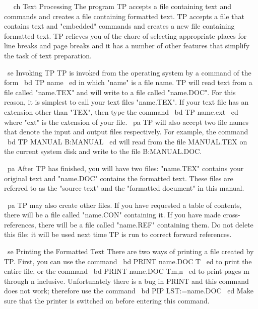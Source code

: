 \ec ~
~ch Text Processing
The program TP accepts a file containing text and commands and creates
a file containing formatted text.
TP accepts a file that contains text and "embedded" commands and creates
a new file containing formatted text.
TP relieves you of the chore of selecting appropriate places for
line breaks and page breaks and it has a number of other features
that simplify the task of text preparation.

~se Invoking TP
TP is invoked from the operating system by a command of the form
~bd TP name ~ed
in which "name" is a file name.
TP will read text from a file called "name.TEX" and will write to a file
called "name.DOC".
For this reason, it is simplest to call your text files "name.TEX".
If your text file has an extension other than "TEX", then type the
command
~bd TP name.ext ~ed
where "ext" is the extension of your file.
~pa TP will also accept two file names that denote the input and output files
respectively.
For example, the command
~bd TP MANUAL B:MANUAL ~ed
will read from the file MANUAL.TEX on the current system disk and write to the
file B:MANUAL.DOC.

~pa After TP has finished, you will have two files:
"name.TEX" contains your original text and "name.DOC" contains the formatted
text.
These files are referred to as the "source text" and the "formatted document"
in this manual.

~pa TP may also create other files.
If you have requested a table of contents, there will be a file called
"name.CON" containing it.
If you have made cross-references, there will be a file called "name.REF"
containing them.
Do not delete this file: it will be used next time TP is run to correct
forward references.

~se Printing the Formatted Text
There are two ways of printing a file created by TP.
First, you can use the command
~bd PRINT name.DOC T ~ed
to print the entire file, or the command
~bd PRINT name.DOC Tm,n ~ed
to print pages m through n inclusive.
Unfortunately there is a bug in PRINT and this command does not work;
therefore use the command
~bd PIP LST:=name.DOC ~ed
Make sure that the printer is switched on before entering this command.

